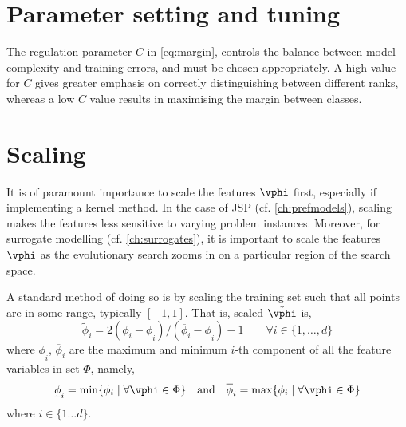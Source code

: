 \begin{comment}
\subsection{Kernel functions}
There are several choices for a kernel $\kappa$, e.g., \emph{polynomial kernel},
\begin{eqnarray}
\kappa_{\text{poly}}(\vec{x}_i,\vec{x}_j)&=& \left(1+\inner{\vec{x}_i}{\vec{x}_j} \right)^p
\end{eqnarray}
of order $p$, or the most commonly used kernel in the literature which implements a Gauss\-ian radial basis function, the \emph{rbf kernel},
\begin{eqnarray}
\kappa_{\text{rbf}}(\vec{x}_i,\vec{x}_j)&=& e^{-\gamma \norm{\vec{x}_i-\vec{x}_j}^2}
\end{eqnarray}
for $\gamma>0$.
\end{comment}

\section{Parameter setting and tuning}
The regulation parameter $C$ in \eqref{eq:margin}, controls the balance between model complexity and training errors, and must be chosen appropriately. A high value for $C$ gives greater emphasis on correctly distinguishing between different ranks, whereas a low $C$ value results in maximising the margin between classes.

\section{Scaling}
It is of paramount importance to scale the features $\vphi$ first, especially if implementing a kernel method. 
In the case of JSP (cf. \cref{ch:prefmodels}), scaling makes the features less sensitive to varying problem instances.
Moreover, for surrogate modelling (cf. \cref{ch:surrogates}), it is important to scale the features $\vphi$ as the evolutionary search zooms in on a particular region of the search space. 

A standard method of doing so is by scaling the training set such that all points are in some range, typically $[-1,1]$. That is, scaled $\tilde{\vphi}$ is,
\begin{equation}\label{eq:scale}
\tilde{\phi}_i = 2 (\phi_i - \underline{\phi}_i) / (\overline{\phi}_i - \underline{\phi}_i) - 1 
\quad\quad \forall i\in\{1,\ldots,d\}
\end{equation}
where $\underline{\phi}_i$, $\overline{\phi}_i$ are the maximum and minimum $i$-th component of all the feature variables in set $\Phi$, namely,
\begin{equation}
\underline{\phi}_i=\min\{\phi_i\;|\;\forall\vphi\in \Phi\} \quad\textrm{and}\quad \overline{\phi}_i=\max\{\phi_i\;|\;\forall\vphi\in \Phi\}
\end{equation}
where $i\in\{1\ldots d\}$. 


